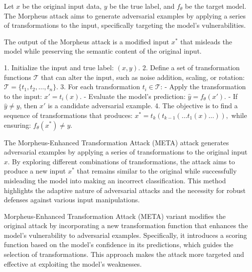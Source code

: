 Let \( x \) be the original input data, \( y \) be the true label, and \( f_{\theta} \) be the target model. The Morpheus attack aims to generate adversarial examples by applying a series of transformations to the input, specifically targeting the model's vulnerabilities.

The output of the Morpheus attack is a modified input \( x^* \) that misleads the model while preserving the semantic content of the original input.

1. Initialize the input and true label:
   $
   (x, y).
   $
2. Define a set of transformation functions \( \mathcal{T} \) that can alter the input, such as noise addition, scaling, or rotation:
   $
   \mathcal{T} = \{t_1, t_2, \ldots, t_n\}.
   $
3. For each transformation \( t_i \in \mathcal{T} \):
   - Apply the transformation to the input:
   $
   x' = t_i(x).
   $
   - Evaluate the model's prediction:
   $
   \hat{y} = f_{\theta}(x').
   $
   - If \( \hat{y} \neq y \), then \( x' \) is a candidate adversarial example.
4. The objective is to find a sequence of transformations that produces:
   $
   x^* = t_k(t_{k-1}(\ldots t_1(x) \ldots)),
   $
   while ensuring:
   $f_{\theta}(x^*) \neq y$.

The Morpheus-Enhanced Transformation Attack (META) attack generates adversarial examples by applying a series of transformations to the original input \( x \). By exploring different combinations of transformations, the attack aims to produce a new input \( x^* \) that remains similar to the original while successfully misleading the model into making an incorrect classification. This method highlights the adaptive nature of adversarial attacks and the necessity for robust defenses against various input manipulations.

Morpheus-Enhanced Transformation Attack (META) variant modifies the original attack by incorporating a new transformation function that enhances the model's vulnerability to adversarial examples. Specifically, it introduces a scoring function based on the model's confidence in its predictions, which guides the selection of transformations. This approach makes the attack more targeted and effective at exploiting the model's weaknesses.
